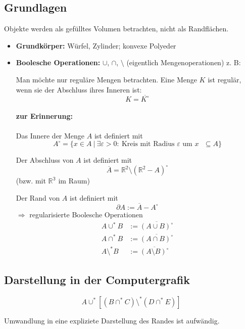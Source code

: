 \subsection{Grundlagen}
Objekte werden als gefülltes Volumen betrachten, nicht als Randflächen.
\begin{itemize}
 \item \textbf{Grundkörper:} Würfel, Zylinder; konvexe Polyeder
 \item \textbf{Boolesche Operationen:} $\cup$, $\cap$, $\setminus$ (eigentlich Mengenoperationen)
	z. B:
	\begin{center}
	\end{center}
	\begin{center}
	\end{center}
	Man möchte nur reguläre Mengen betrachten. Eine Menge $K$ ist regulär, wenn sie der Abschluss ihres Inneren ist:
	\[K = \overline{K^\circ}\]
	\paragraph*{zur Erinnerung:} Das Innere der Menge $A$ ist definiert mit
	\[A^\circ = \{x \in A\ |\ \exists\varepsilon > 0:\ \text{Kreis mit Radius $\varepsilon$ um $x$ $\subseteq A$}\}\]
	\begin{center}
	\end{center}
	Der Abschluss von $A$ ist definiert mit
	\[\overline A = \mathbb{R}^2 \setminus (\mathbb{R}^2 - A)^\circ\]
	(bzw. mit $\mathbb{R^3}$ im Raum)
	\begin{center}
	\end{center}
	Der Rand von $A$ ist definiert mit
	\[\partial A := \overline A - A^\circ\]
	$\Rightarrow$ regularisierte Boolesche Operationen
	\begin{align*}
	 A \cup^* B &:= \overline{(A \cup B)^\circ}\\
	 A \cap^* B &:= \overline{(A \cap B)^\circ}\\
	 A \setminus^* B &:= \overline{(A \setminus B)^\circ}
	\end{align*}
	\begin{center}
	\end{center}
\end{itemize}
\subsection{Darstellung in der Computergrafik}
\[A \cup^* \left[(B \cap^* C) \setminus^* (D \cap^* E)\right]\]
\begin{center}
\end{center}
Umwandlung in eine expliziete Darstellung des Randes ist aufwändig.

